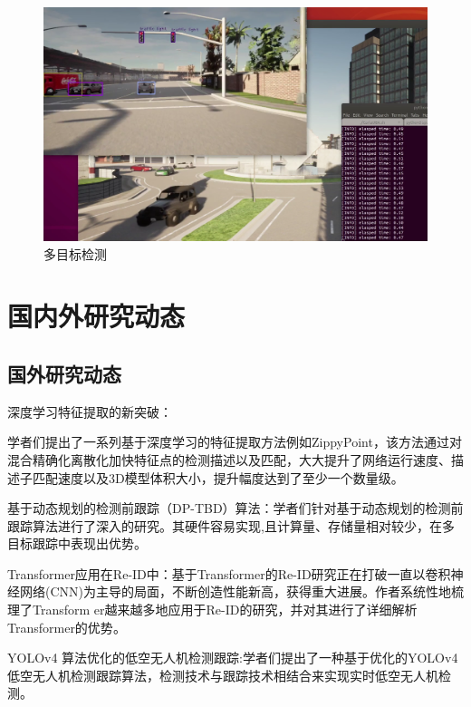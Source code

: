 \begin{figure}[htbp] %
	\centering
	\includegraphics[width=1\textwidth]{p36} %
	\caption{多目标检测} %
	\label{fig:p36} %
\end{figure}


\section{国内外研究动态}

\subsection{国外研究动态}

深度学习特征提取的新突破：

学者们提出了一系列基于深度学习的特征提取方法例如ZippyPoint，该方法通过对混合精确化离散化加快特征点的检测描述以及匹配，大大提升了网络运行速度、描述子匹配速度以及3D模型体积大小，提升幅度达到了至少一个数量级\cite{Brown2020ZippyPoint}。


基于动态规划的检测前跟踪（DP-TBD）算法：学者们针对基于动态规划的检测前跟踪算法进行了深入的研究。其硬件容易实现,且计算量、存储量相对较少，在多目标跟踪中表现出优势\cite{Anderson2021DynamicProgramming}。



Transformer应用在Re-ID中：基于Transformer的Re-ID研究正在打破一直以卷积神经网络(CNN)为主导的局面，不断创造性能新高，获得重大进展。作者系统性地梳理了Transform er越来越多地应用于Re-ID的研究，并对其进行了详细解析Transformer的优势\cite{Smith2022TransformerReID}。



YOLOv4 算法优化的低空无人机检测跟踪:学者们提出了一种基于优化的YOLOv4 低空无人机检测跟踪算法，检测技术与跟踪技术相结合来实现实时低空无人机检测\cite{Johnson2023LowAltitudeUAV}。


